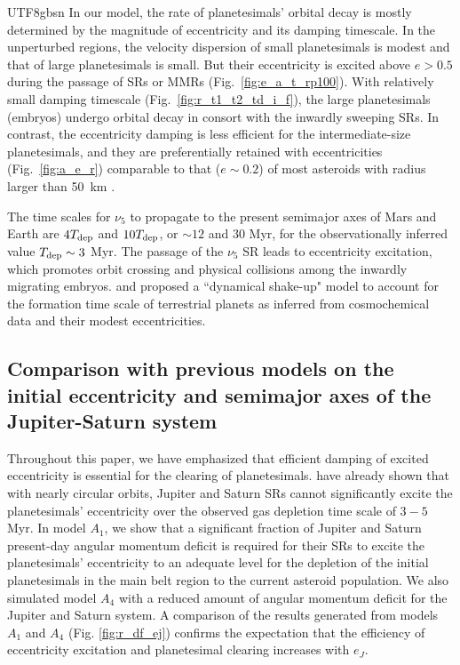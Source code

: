 \documentclass[tighten]{aastex6}
\begin{document}
\begin{CJK*}{UTF8}{gbsn}
In our model, the rate of planetesimals' orbital decay
is mostly determined by the magnitude of eccentricity and its damping 
timescale.  In the unperturbed regions, the velocity dispersion of
small planetesimals is modest and that of large planetesimals is 
small.  But their 
eccentricity is excited above $e>0.5$ during the passage of SRs or MMRs 
(Fig.~\ref{fig:e_a_t_rp100}). With relatively small damping timescale
(Fig.~\ref{fig:r_t1_t2_td_i_f}), the large planetesimals (embryos) 
undergo orbital decay in 
consort with the inwardly sweeping SRs.  In contrast, the eccentricity
damping is less efficient for the intermediate-size planetesimals, and
they are preferentially retained with eccentricities (Fig.~\ref{fig:a_e_r}) 
comparable to that ($e \sim 0.2$) of most asteroids with radius larger 
than 50~km \citep{knezevic2003}. 

The time scales for $\nu_5$ to propagate to the present semimajor 
axes of Mars and Earth are $4T_{\rm dep}$ and $10T_{\rm dep}$, or $\sim 12$ 
and $30$ Myr, for the observationally inferred value $T_{\rm dep} 
\sim 3$ Myr.  The passage of the $\nu_5$ SR leads to eccentricity 
excitation, which promotes orbit crossing and physical collisions 
among the inwardly migrating embryos.  \cite{nagasawa2005} and 
\cite{thommes2008} proposed a ``dynamical shake-up" model to account 
for the formation time scale of terrestrial planets as inferred from 
cosmochemical data \citep{kleine2009} and their modest eccentricities.

\subsection{Comparison with previous models on the initial 
eccentricity and semimajor axes of the Jupiter-Saturn system} 

Throughout this paper, we have emphasized that efficient damping of  
excited eccentricity is essential for the clearing of planetesimals. 
\cite{obrien2007} have already shown that with nearly circular 
orbits, Jupiter and Saturn SRs cannot significantly excite the 
planetesimals' eccentricity over the observed gas depletion time 
scale of $3-5$ Myr.  In model 
$A_1$, we show that a significant fraction of Jupiter and Saturn 
present-day angular momentum deficit is required for their SRs
to excite the planetesimals' eccentricity to an adequate level 
for the depletion of the initial planetesimals in the main belt
region to the current asteroid population.  We also simulated
model $A_4$ with a reduced amount of angular momentum deficit for the 
Jupiter and Saturn system. A comparison of the results generated 
from models $A_1$ and $A_4$ (Fig. \ref{fig:r_df_ej}) confirms the 
expectation that the efficiency of eccentricity excitation 
and planetesimal clearing increases with $e_J$.


\end{CJK*}
\end{document}
